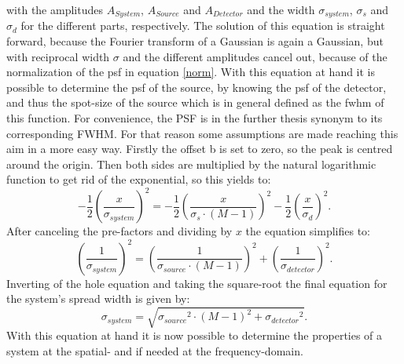 with the amplitudes $A_{System}$, $A_{Source}$ and $A_{Detector}$ and the width $\sigma_{system}$, $\sigma_{s}$ and $\sigma_{d}$ for the different parts, respectively. The solution of this equation is straight forward, because the Fourier transform of a Gaussian is again a Gaussian, but with reciprocal width $\sigma$ and the different amplitudes cancel out, because of the normalization of the \gls{psf} in equation \ref{norm}.  With this equation at hand it is possible to determine the \gls{psf} of the source, by knowing the \gls{psf} of the detector, and thus the spot-size of the source which is in general defined as the \gls{fwhm} of this function. For convenience, the PSF is in the further thesis synonym to its corresponding FWHM.  For that reason some assumptions are made reaching this aim in a more easy way. Firstly the offset b is set to zero, so the peak is centred around the origin. Then both sides are multiplied by the natural logarithmic function to get rid of the exponential, so this yields to:
\begin{equation}
-\frac{1}{2}\left(\frac{x}{\sigma_{system}}\right)^{2} = -\frac{1}{2}\left(\frac{x}{\sigma_{s}\cdot(M-1)}\right)^{2}-\frac{1}{2}\left(\frac{x}{\sigma_{d}}\right)^{2}.
\end{equation}
After canceling the pre-factors and dividing by $x$ the equation simplifies to:
\begin{equation}
\left(\frac{1}{\sigma_{system}}\right)^{2} = \left(\frac{1}{\sigma_{source}\cdot(M-1)}\right)^{2}+\left(\frac{1}{\sigma_{detector}}\right)^{2}.
\end{equation}
Inverting of the hole equation and taking the square-root the final equation for the system's spread width is given by:
\begin{equation}\label{spotwidth}
 \sigma_{system} = \sqrt{{\sigma_{source}}^{2}\cdot(M-1)^{2}+{\sigma_{detector}}^{2}}.
\end{equation}
With this equation at hand it is now possible to determine the properties of a system at the spatial- and if needed at the frequency-domain.








